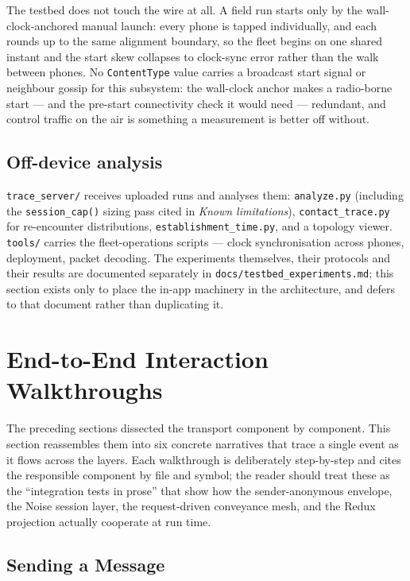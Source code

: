 \documentclass[11pt]{report}
\newcommand{\code}[1]{\texttt{\small #1}}
\begin{document}
The testbed does not touch the wire at all. A field run starts only by the wall-clock-anchored manual launch: every phone is tapped individually, and each rounds up to the same alignment boundary, so the fleet begins on one shared instant and the start skew collapses to clock-sync error rather than the walk between phones. No \code{ContentType} value carries a broadcast start signal or neighbour gossip for this subsystem: the wall-clock anchor makes a radio-borne start --- and the pre-start connectivity check it would need --- redundant, and control traffic on the air is something a measurement is better off without.

\subsection{Off-device analysis}

\code{trace_server/} receives uploaded runs and analyses them: \code{analyze.py} (including the \code{session_cap()} sizing pass cited in \emph{Known limitations}), \code{contact_trace.py} for re-encounter distributions, \code{establishment_time.py}, and a topology viewer. \code{tools/} carries the fleet-operations scripts --- clock synchronisation across phones, deployment, packet decoding. The experiments themselves, their protocols and their results are documented separately in \code{docs/testbed_experiments.md}; this section exists only to place the in-app machinery in the architecture, and defers to that document rather than duplicating it.

\section{End-to-End Interaction Walkthroughs}

The preceding sections dissected the transport component by component. This
section reassembles them into six concrete narratives that trace a single
event as it flows across the layers. Each walkthrough is deliberately
step-by-step and cites the responsible component by file and symbol; the reader
should treat these as the ``integration tests in prose'' that show how the
sender-anonymous envelope, the Noise session layer, the request-driven conveyance mesh,
and the Redux projection actually cooperate at run time.

\subsection{Sending a Message}
\end{document}
